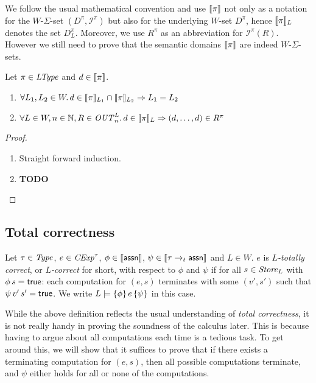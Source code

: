 \documentclass[12pt,a4paper]{report}
\newcommand{\CExp}{\nstyle{CExp}}
\newcommand{\OUT}{\nstyle{OUT}}
\newcommand{\I}{\mathcal{I}}
\begin{document}
We follow the usual mathematical convention and use $\llbracket\pi\rrbracket$ not only as a notation
for the $W$-$\Sigma$-set $(D^\pi,\I^\pi)$ but also for the underlying $W$-set $D^\pi$,
hence $\llbracket\pi\rrbracket_L$ denotes the set $D^\pi_L$. Moreover, we use $R^\pi$ as an abbreviation
for $\I^\pi(R)$. However we still need to prove that the semantic domains $\llbracket\pi\rrbracket$
are indeed $W$-$\Sigma$-sets.

\begin{lemma}
  Let $\pi\in\mathit{LType}$ and $d \in \llbracket\pi\rrbracket$.
  \begin{enumerate}
    \item $\forall L_1,L_2\in W.\, d \in \llbracket\pi\rrbracket_{L_1} \cap \llbracket\pi\rrbracket_{L_2} \Rightarrow L_1 = L_2$
    \item $\forall L \in W, n \in \N, R\in \OUT^L_n.\, d \in \semantic{\pi}_L \Rightarrow (d,\ldots,d) \in R^\pi$
  \end{enumerate}
\end{lemma}

\begin{proof} \
  \begin{enumerate}
    \item Straight forward induction.

    \item {\bf TODO}
  \end{enumerate}
\end{proof}



\subsection{Total correctness}

\begin{definition}
  Let $\tau\in\mathit{Type}$, $e\in\CExp^\tau$, $\phi\in\llbracket\mathsf{assn}\rrbracket$, $\psi\in\llbracket\tau\rightarrow_t\mathsf{assn}\rrbracket$
  and $L\in W$. $e$ is {\em $L$-totally correct}, or {\em $L$-correct} for short, with respect to $\phi$ and $\psi$ if for
  all $s\in\mathit{Store}_L$ with $\phi\,s=\mathsf{true}$: each computation for $(e,s)$ terminates with some
  $(v',s')$ such that $\psi\,v'\,s'=\mathsf{true}$. We write $L \models \{\phi\}\,e\,\{\psi\}$ in this case.
\end{definition}

While the above definition reflects the usual understanding of {\em total correctness}, it is not really handy
in proving the soundness of the calculus later. This is because having to argue about all computations each
time is a tedious task. To get around this, we will show that it suffices to prove that if there exists a
terminating computation for $(e,s)$, then all possible computations terminate, and $\psi$ either holds for all
or none of the computations.
\end{document}
